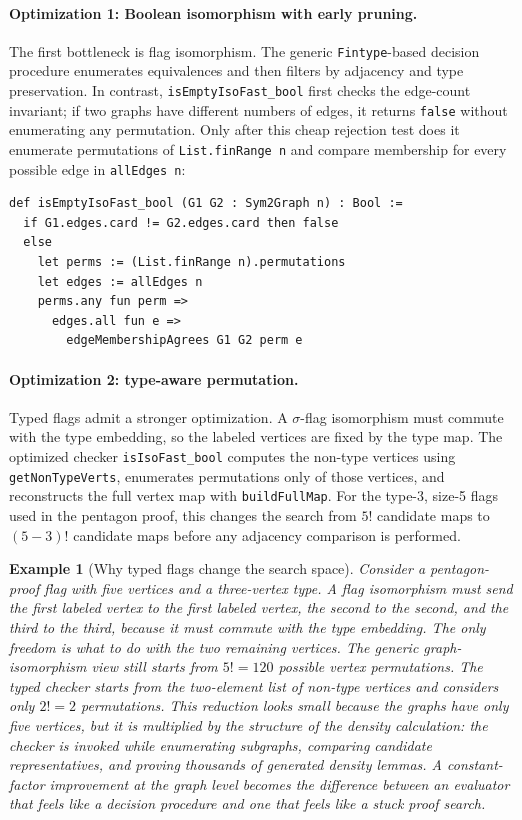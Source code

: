 \documentclass{article}
\newtheorem{example}[theorem]{Example}
\newcommand{\lean}[1]{\texttt{#1}}
\begin{document}
\paragraph{Optimization 1: Boolean isomorphism with early pruning.}
The first bottleneck is flag isomorphism.  The generic \lean{Fintype}-based
decision procedure enumerates equivalences and then filters by adjacency and
type preservation.  In contrast, \lean{isEmptyIsoFast\_bool} first checks the
edge-count invariant; if two graphs have different numbers of edges, it
returns \lean{false} without enumerating any permutation.  Only after this
cheap rejection test does it enumerate permutations of \lean{List.finRange n}
and compare membership for every possible edge in \lean{allEdges n}:
\begin{lstlisting}
def isEmptyIsoFast_bool (G1 G2 : Sym2Graph n) : Bool :=
  if G1.edges.card != G2.edges.card then false
  else
    let perms := (List.finRange n).permutations
    let edges := allEdges n
    perms.any fun perm =>
      edges.all fun e =>
        edgeMembershipAgrees G1 G2 perm e
\end{lstlisting}

\paragraph{Optimization 2: type-aware permutation.}
Typed flags admit a stronger optimization.  A $\sigma$-flag isomorphism must
commute with the type embedding, so the labeled vertices are fixed by the
type map.  The optimized checker \lean{isIsoFast\_bool} computes the
non-type vertices using \lean{getNonTypeVerts}, enumerates permutations only
of those vertices, and reconstructs the full vertex map with
\lean{buildFullMap}.  For the type-3, size-5 flags used in the pentagon
proof, this changes the search from $5!$ candidate maps to $(5-3)!$ candidate
maps before any adjacency comparison is performed.

\begin{example}[Why typed flags change the search space]
  Consider a pentagon-proof flag with five vertices and a three-vertex type.
  A flag isomorphism must send the first labeled vertex to the first labeled
  vertex, the second to the second, and the third to the third, because it
  must commute with the type embedding.  The only freedom is what to do with
  the two remaining vertices.  The generic graph-isomorphism view still
  starts from $5! = 120$ possible vertex permutations.  The typed checker
  starts from the two-element list of non-type vertices and considers only
  $2! = 2$ permutations.  This reduction looks small because the graphs have
  only five vertices, but it is multiplied by the structure of the density
  calculation: the checker is invoked while enumerating subgraphs, comparing
  candidate representatives, and proving thousands of generated density
  lemmas.  A constant-factor improvement at the graph level becomes the
  difference between an evaluator that feels like a decision procedure and
  one that feels like a stuck proof search.
\end{example}
\end{document}
